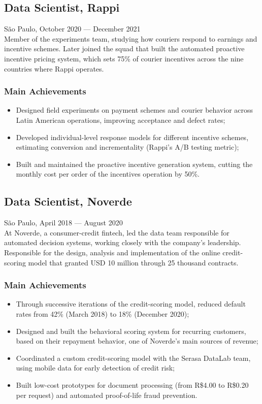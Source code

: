 \documentclass{article}
\newcommand{\jobdate}[3]{
\large
\vspace{0.05em}
  {#1, #2 --- #3}
\vspace{0.5em}
\\
}
\begin{document}
\subsection{Data Scientist, Rappi}
\jobdate{São Paulo}{October 2020}{December 2021}
Member of the experiments team, studying how couriers respond to earnings and incentive schemes. Later joined the squad that built the automated proactive incentive pricing system, which sets 75\% of courier incentives across the nine countries where Rappi operates.
\subsubsection{Main Achievements}

\begin{itemize}
\item{Designed field experiments on payment schemes and courier behavior across Latin American operations, improving acceptance and defect rates;}
\item{Developed individual-level response models for different incentive schemes, estimating conversion and incrementality (Rappi's A/B testing metric);}
\item{Built and maintained the proactive incentive generation system, cutting the monthly cost per order of the incentives operation by 50\%.}
\end{itemize}

\subsection{Data Scientist, Noverde}
\jobdate{São Paulo}{April 2018}{August 2020}
At Noverde, a consumer-credit fintech, led the data team responsible for automated decision systems, working closely with the company's leadership. Responsible for the design, analysis and implementation of the online credit-scoring model that granted USD 10 million through 25 thousand contracts.
\subsubsection{Main Achievements}

\begin{itemize}
\item{Through successive iterations of the credit-scoring model, reduced default rates from 42\% (March 2018) to 18\% (December 2020);}
\item{Designed and built the behavioral scoring system for recurring customers, based on their repayment behavior, one of Noverde's main sources of revenue;}
\item{Coordinated a custom credit-scoring model with the Serasa DataLab team, using mobile data for early detection of credit risk;}
\item{Built low-cost prototypes for document processing (from R\$4.00 to R\$0.20 per request) and automated proof-of-life fraud prevention.}
\end{itemize}
\end{document}

